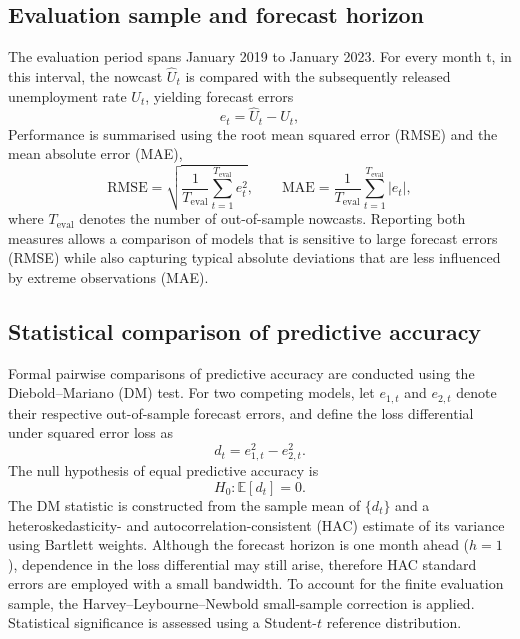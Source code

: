 \documentclass[12pt,a4paper]{article}
\begin{document}
\subsection{Evaluation sample and forecast horizon}
The evaluation period spans January 2019 to January 2023. For every month t, in this interval, the nowcast
$\widehat{U}_t$ is compared with the subsequently released unemployment rate $U_t$, yielding forecast errors
\begin{equation}
    e_t = \widehat{U}_t - U_t,
\end{equation}
Performance is summarised using the root mean squared error (RMSE) and the mean absolute error (MAE),
\begin{equation}
    \text{RMSE} = \sqrt{\frac{1}{T_{\text{eval}}} \sum_{t=1}^{T_{\text{eval}}} e_{t}^2}, \qquad 
    \text{MAE} = \frac{1}{T_{\text{eval}}} \sum_{t=1}^{T_{\text{eval}}} |e_t|,
\end{equation}
where $T_{\text{eval}}$ denotes the number of out-of-sample nowcasts.
Reporting both measures allows a comparison of models that is sensitive to large forecast errors (RMSE) while also capturing typical absolute deviations that are less influenced by extreme observations (MAE).



\subsection{Statistical comparison of predictive accuracy}
Formal pairwise comparisons of predictive accuracy are conducted using the Diebold--Mariano (DM) test. For two competing models,
let $e_{1,t}$ and $e_{2,t}$ denote their respective out-of-sample forecast errors, and define the loss differential under squared error loss as
\begin{equation}
     d_t = e_{1,t}^2 - e_{2,t}^2.
\end{equation}
The null hypothesis of equal predictive accuracy is
\begin{equation}
    H_0: \mathbb{E}[d_t] = 0 .
\end{equation}
The DM statistic is constructed from the sample mean of $\{d_t\}$ and a heteroskedasticity- and autocorrelation-consistent (HAC) estimate of its variance using Bartlett weights. Although the forecast horizon is one month ahead ($h=1$), dependence in the loss differential may still arise, therefore HAC standard errors are employed with a small bandwidth. To account for the finite evaluation sample, the Harvey--Leybourne--Newbold small-sample correction is applied. Statistical significance is assessed using a Student-$t$ reference distribution.
\end{document}
